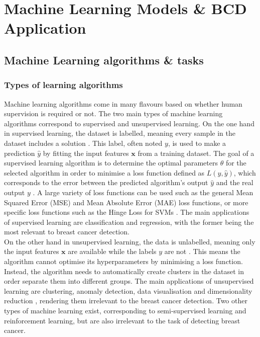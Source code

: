 

\section{Machine Learning Models \& BCD Application}
\label{sec:litreview-MLmodel-BCDapplications}

\subsection{Machine Learning algorithms \& tasks}

\subsubsection{Types of learning algorithms}

Machine learning algorithms come in many flavours based on whether human supervision is required or not. The two main types of machine learning algorithms correspond to supervised and unsupervised learning. On the one hand in supervised learning, the dataset is labelled, meaning every sample in the dataset includes a solution \cite{Geron2019}. This label, often noted $y$, is used to make a prediction $\hat{y}$ by fitting the input features $\textbf{x}$ from a training dataset. The goal of a supervised learning algorithm is to determine the optimal parameters $\theta$ for the selected algorithm in order to minimise a loss function defined as $L(y,\hat{y})$, which corresponds to the error between the predicted algorithm's output $\hat{y}$ and the real output $y$ \cite{Litjens2017}. A large variety of loss functions can be used such as the general Mean Squared Error (MSE) and Mean Absolute Error (MAE) loss functions, or more specific loss functions such as the Hinge Loss for SVMs \cite{Geron2019}. The main applications of supervised learning are classification and regression, with the former being the most relevant to breast cancer detection.\\

On the other hand in unsupervised learning, the data is unlabelled, meaning only the input features $\textbf{x}$ are available while the labels $y$ are not \cite{Litjens2017}. This means the algorithm cannot optimise its hyperparameters by minimising a loss function. Instead, the algorithm needs to automatically create clusters in the dataset in order separate them into different groups. The main applications of unsupervised learning are clustering, anomaly detection, data visualisation and dimensionality reduction \cite{Geron2019}, rendering them irrelevant to the breast cancer detection. Two other types of machine learning exist, corresponding to semi-supervised learning and reinforcement learning, but are also irrelevant to the task of detecting breast cancer.\\

